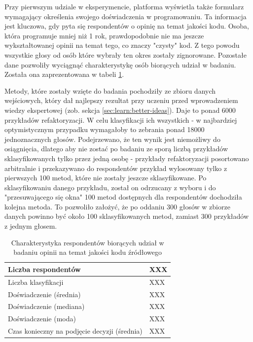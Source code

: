 \documentclass[12pt]{report}
\begin{document}
Przy pierwszym udziale w eksperymencie, platforma wyświetla także formularz wymagający określenia swojego doświadczenia w programowaniu. Ta informacja jest kluczowa, gdy pyta się respondentów o opinię na temat jakości kodu. Osoba, która programuje mniej niż 1 rok, prawdopodobnie nie ma jeszcze wykształtowanej opinii na temat tego, co znaczy "czysty" kod. Z tego powodu wszystkie głosy od osób które wybrały ten okres zostały zignorowane. Pozostałe dane pozwoliły wyciągnąć charakterystykę osób biorących udział w badaniu. Została ona zaprezentowana w tabeli \ref{tbl:impl:codefracz-respondents}.

Metody, które zostały wzięte do badania pochodziły ze zbioru danych wejściowych, który dał najlepszy rezultat przy uczeniu przed wprowadzeniem wiedzy ekspertowej (zob. sekcja \ref{sec:learn:better-ideas}). Daje to ponad 6000 przykładów refaktoryzacji. W celu klasyfikacji ich wszystkich - w najbardziej optymistycznym przypadku wymagałoby to zebrania ponad 18000 jednoznacznych głosów. Podejrzewano, że ten wynik jest niemożliwy do osiągnięcia, dlatego aby nie zostać po badaniu ze sporą liczbą przykładów sklasyfikowanych tylko przez jedną osobę - przykłady refaktoryzacji posortowano arbitralnie i przekazywano do respondentów przykład wylosowany tylko z pierwszych 100 metod, które nie zostały jeszcze sklasyfikowane. Po sklasyfikowaniu danego przykładu, został on odrzucany z wyboru i do "przesuwającego się okna" 100 metod dostępnych dla respondentów dochodziła kolejna metoda. To pozwoliło założyć, że po oddaniu 300 głosów w zbiorze danych powinno być około 100 sklasyfikowanych metod, zamiast 300 przykładów z jednym głosem.

\begin{table}[t]
\caption{Charakterystyka respondentów biorących udział w badaniu opinii na temat jakości kodu źródłowego}
\label{tbl:impl:codefracz-respondents}
\begin{tabular}{|l|l|}
  \hline 
  Liczba respondentów & XXX \\ \hline
  Liczba klasyfikacji & XXX \\ \hline
  Doświadczenie (średnia) & XXX \\ \hline
  Doświadczenie (mediana) & XXX \\ \hline
  Doświadczenie (moda) & XXX \\ \hline
  Czas konieczny na podjęcie decyzji (średnia) & XXX \\ \hline
\end{tabular} 
\end{table}
\end{document}
